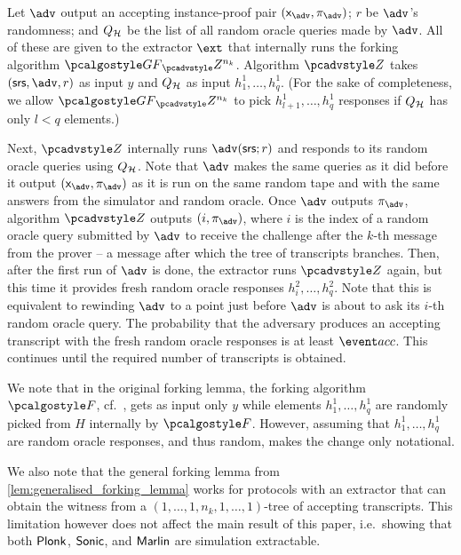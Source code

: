 Let $\adv$ output an accepting instance-proof pair $(\inp_{\advse},\zkproof_{\advse})$;
$r$ be $\adv$'s randomness; and $Q_{\mathcal{H}}$ be the list of all random oracle queries made by
$\adv$.  All of these are given to the extractor $\ext$ that internally runs the forking
algorithm $\genforking_\zdv^{n_k}$.  Algorithm $\zdv$ takes
$(\srs, \advse, r)$ as input $y$ and $Q_{\mathcal{H}}$ as input $h_1^1, \ldots, h_q^1$.
(For the sake of completeness, we allow $\genforking_\zdv^{n_k}$ to pick
$h^1_{l + 1}, \ldots, h^1_q$ responses if $Q_{\mathcal{H}}$ has only $l < q$ elements.)

Next, $\zdv$ internally runs $\adv(\srs; r)$ %
and responds to its random oracle queries using $Q_{\mathcal{H}}$. Note that $\adv$ makes the same
queries as it did before it output $(\inp_{\advse}, \zkproof_{\advse})$ as it is run on
the same random tape and with the same answers from the simulator and random oracle. Once
$\adv$ outputs $\zkproof_{\advse}$, algorithm $\zdv$ outputs $(i, \zkproof_{\advse})$,
where $i$ is the index of a random oracle query submitted by $\advse$ to receive the
challenge after the $k$-th message from the prover -- a message after which the tree of
transcripts branches.  Then, after the first run of $\advse$ is done, the extractor runs
$\zdv$ again, but this time it provides fresh random oracle responses
$h^2_i, \ldots, h^2_q$. Note that this is equivalent to rewinding $\advse$ to a point just
before $\advse$ is about to ask its $i$-th random oracle query. The probability that the
adversary produces an accepting transcript with the fresh random oracle responses is at
least $\accProb$. This continues until the required number of transcripts is obtained.

We note that in the original forking lemma, the forking algorithm $\forking$,
cf.~\cite{CCS:BelNev06}, gets as input only $y$ while elements $h^1_1, \ldots,
h^1_q$ are randomly picked from $H$ internally by $\forking$. However, assuming
that $h^1_1, \ldots, h^1_q$ are random oracle responses, and thus random, makes
the change only notational.

We also note that the general forking lemma from
\cref{lem:generalised_forking_lemma} works for protocols with an extractor that can obtain the
witness from a $(1, \ldots, 1, n_k, 1, \ldots, 1)$-tree of accepting
transcripts. This limitation however does not affect the main result of this
paper, i.e.~showing that both $\textnormal{\textsf{Plonk}}$, ${\textnormal{\textsf{Sonic}}}$, and ${\textnormal{\textsf{Marlin}}}$ are simulation extractable.



